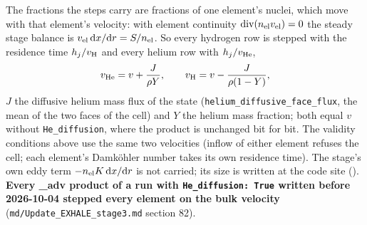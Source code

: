 \documentclass[english,a4paper]{my_memo}
\begin{document}
The fractions the steps carry are fractions of one element's nuclei, which
move with that element's velocity: with element continuity
${\rm div}(n_{\rm el}v_{\rm el})=0$ the steady stage balance is
$v_{\rm el}\,{\rm d}x/{\rm d}r=S/n_{\rm el}$. So every hydrogen row is stepped
with the residence time $h_j/v_{\rm H}$ and every helium row with
$h_j/v_{\rm He}$,
\begin{equation*}
v_{\rm He}=v+\frac{J}{\rho Y},\qquad v_{\rm H}=v-\frac{J}{\rho(1-Y)},
\end{equation*}
$J$ the diffusive helium mass flux of the state (\texttt{helium\_diffusive\_face\_flux},
the mean of the two faces of the cell) and $Y$ the helium mass fraction; both
equal $v$ without \texttt{He\_diffusion}, where the product is unchanged bit
for bit. The validity conditions above use the same two velocities (inflow of
either element refuses the cell; each element's Damk\"ohler number takes its
own residence time). The stage's own eddy term $-n_{\rm el}K\,{\rm d}x/{\rm d}r$
is not carried; its size is written at the code site
(). \textbf{Every \_adv product of a run with
\texttt{He\_diffusion: True} written before 2026-10-04 stepped every element
on the bulk velocity} (\texttt{md/Update\_EXHALE\_stage3.md} section 82).
\end{document}
